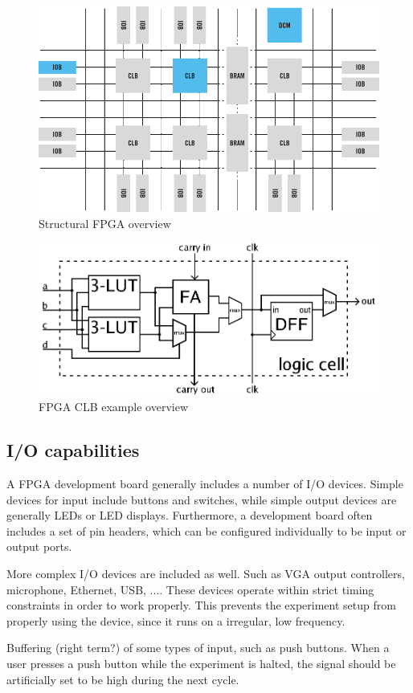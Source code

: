 \documentclass[openright]{template/uva-bachelor-thesis}
\begin{document}
\begin{figure}
\centering
\includegraphics[width=.7\textwidth]{img/fpga-block-structure}
\caption{Structural FPGA overview \cite{xilinxFPGA}}
\label{fig:fpgastructure}
\end{figure}

\begin{figure}
\centering
\includegraphics[width=.7\textwidth]{img/fpga-clb}
\caption{FPGA CLB example overview \cite{fpgaclbimg}}
\label{fig:my_label}
\end{figure}



\subsection{I/O capabilities}
A FPGA development board generally includes a number of I/O devices. Simple devices for input include buttons and switches, while simple output devices are generally LEDs or LED displays. Furthermore, a development board often includes a set of pin headers, which can be configured individually to be input or output ports. 

More complex I/O devices are included as well. Such as VGA output controllers, microphone, Ethernet, USB, .... These devices operate within strict timing constraints in order to work properly. This prevents the experiment setup from properly using the device, since it runs on a irregular, low frequency. 

Buffering (right term?) of some types of input, such as push buttons. When a user presses a push button while the experiment is halted, the signal should be artificially set to be high during the next cycle.
\end{document}
